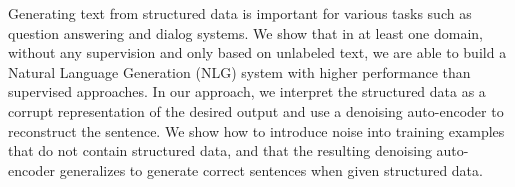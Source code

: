 Generating text from structured data is important for various tasks such as question answering and dialog systems. We show that in at least one domain, without any supervision and only based on unlabeled text, we are able to build a Natural Language Generation (NLG) system with higher performance than supervised approaches. In our approach, we interpret the structured data as a corrupt representation of the desired output and use a denoising auto-encoder to reconstruct the sentence. We show how to introduce noise into training examples that do not contain structured data, and that the resulting denoising auto-encoder generalizes to generate correct sentences when given structured data.
